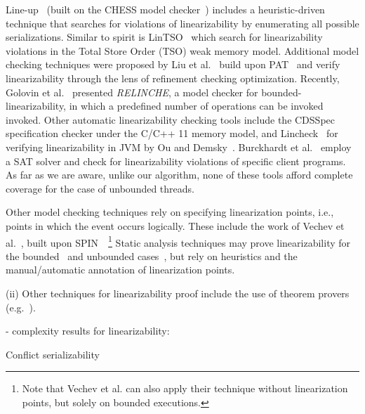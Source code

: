 Line-up~\cite{BuDeMuTa10} (built on the CHESS model checker~\cite{MuQaBaBaNaNe08}) includes a heuristic-driven technique that searches for violations of linearizability by enumerating all possible serializations. Similar to spirit is LinTSO~\cite{BuGoMuYa12} which search for linearizability violations in the Total Store
Order (TSO) weak memory model.
%
Additional model checking techniques were proposed by Liu et al.~\cite{LiChLiSuZhDo12} build upon PAT~\cite{SuLuDoPa09} and verify linearizability through the lens of refinement checking optimization.
%
Recently, Golovin et al.~\cite{GoKoVa25} presented \textit{RELINCHE}, a model checker for bounded-linearizability, in which a predefined number of operations can be invoked invoked.
%
Other automatic linearizability checking tools include the CDSSpec specification checker under the C/C++ 11 memory model, and Lincheck~\cite{KoDeSoTsAl23} for verifying linearizability in JVM by Ou and Demsky~\cite{OuDe17}. 
%
Burckhardt et al.~\cite{BuAlMa07} employ a SAT solver and check for linearizability violations of specific client programs.
%
As far as we are aware, unlike our algorithm, none of these tools afford complete coverage for the case of unbounded threads.
%

Other model checking techniques rely on specifying linearization points, i.e., points in which the event occurs logically.
%
These include the work of Vechev et al.~\cite{VeYaYo09}, built upon SPIN~\cite{Ho97}~\footnote{Note that Vechev et al. can also apply their technique without linearization points, but solely on bounded executions.}
%
Static analysis techniques may prove linearizability for the bounded~\cite{AmRiReSaYa07} and unbounded cases~\cite{BeLeMaRaSa08, Va09, Va10}, but rely on heuristics and the manual/automatic annotation of linearization points.
%




(ii) Other techniques for linearizability proof include the use of theorem provers (e.g.~\cite{CoDoGr05, DeScWe11}).


- complexity results for linearizability:

Conflict serializability

